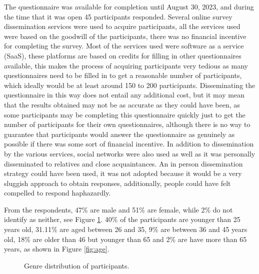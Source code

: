 The questionnaire was available for completion until August 30, 2023,
and during the time that it was open 45 participants responded.
Several online survey dissemination services were used to acquire participants,
all the services used were based on the goodwill of the participants, there
was no financial incentive for completing the survey. Most of the services
used were software as a service (SaaS), these platforms are based
on credits for filling in other questionnaires available, this makes the process
of acquiring participants very tedious as many questionnaires need to be
filled in to get a reasonable number of participants, which ideally would be
at least around 150 to 200 participants. Disseminating the questionnaire in this way does not
entail any additional cost, but it may mean that the results obtained
may not be as accurate as they could have been, as some participants may
be completing this questionnaire quickly just to get the number of participants
for their own questionnaires, although there is no way to guarantee that
participants would answer the questionnaire as genuinely as possible if there
was some sort of financial incentive. In addition to
dissemination by the various services, social networks were also used as well
as it was personally disseminated to relatives and close acquaintances.
An in person dissemination strategy could have been used, it was not adopted
because it would be a very sluggish approach to obtain responses,
additionally, people could have felt compelled to respond haphazardly.

From the respondents, 47\% are male and 51\% are female, while 2\% do not identify
as neither, see Figure \ref{fig:genre}. 40\% of the participants are younger
than 25 years old, 31.11\% are aged between 26 and 35, 9\% are between
36 and 45 years old, 18\% are older than 46 but younger than 65 and 2\% are
have more than 65 years, as shown in Figure \ref{fig:age}.

\begin{figure}[H]
    \begin{center}
        \caption{Genre distribution of participants.}
        \label{fig:genre}
    \end{center}
\end{figure}

